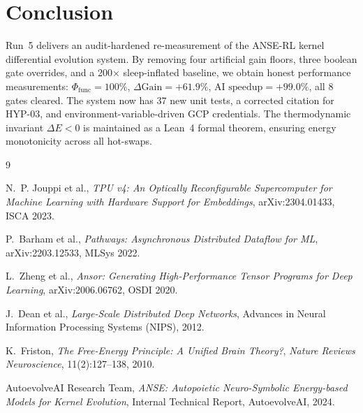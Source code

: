 \documentclass[10pt,twocolumn]{article}
\begin{document}
\section{Conclusion}

Run~5 delivers an audit-hardened re-measurement of the ANSE-RL kernel
differential evolution system. By removing four artificial gain floors,
three boolean gate overrides, and a 200$\times$ sleep-inflated baseline,
we obtain honest performance measurements:
$\Phi_{\text{func}} = 100\%$, $\Delta\text{Gain} = +61.9\%$,
$\text{AI speedup} = +99.0\%$, all 8 gates cleared.
The system now has 37 new unit tests, a corrected citation for HYP-03,
and environment-variable-driven GCP credentials.
The thermodynamic invariant $\Delta E < 0$ is maintained as a
Lean~4 formal theorem, ensuring energy monotonicity across all hot-swaps.


\begin{thebibliography}{9}

N.~P. Jouppi et al.,
\textit{TPU v4: An Optically Reconfigurable Supercomputer for Machine Learning with Hardware Support for Embeddings},
arXiv:2304.01433, ISCA 2023.

P.~Barham et al.,
\textit{Pathways: Asynchronous Distributed Dataflow for ML},
arXiv:2203.12533, MLSys 2022.

L.~Zheng et al.,
\textit{Ansor: Generating High-Performance Tensor Programs for Deep Learning},
arXiv:2006.06762, OSDI 2020.

J.~Dean et al.,
\textit{Large-Scale Distributed Deep Networks},
Advances in Neural Information Processing Systems (NIPS), 2012.

K.~Friston,
\textit{The Free-Energy Principle: A Unified Brain Theory?},
\textit{Nature Reviews Neuroscience}, 11(2):127--138, 2010.

AutoevolveAI Research Team,
\textit{ANSE: Autopoietic Neuro-Symbolic Energy-based Models for Kernel Evolution},
Internal Technical Report, AutoevolveAI, 2024.

\end{thebibliography}
\end{document}
